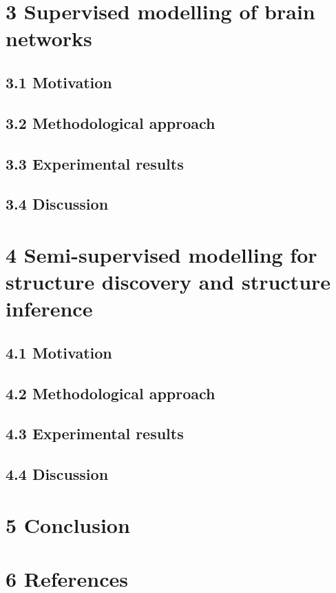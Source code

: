 \documentclass[authoryear,review,3p]{elsarticle}
\begin{document}
\section*{3 Supervised modelling of brain networks}

\subsection*{3.1 Motivation}
\subsection*{3.2 Methodological approach}
\subsection*{3.3 Experimental results}
\subsection*{3.4 Discussion}


\section*{4 Semi-supervised modelling for structure discovery
and structure inference}

\subsection*{4.1 Motivation}
\subsection*{4.2 Methodological approach}
\subsection*{4.3 Experimental results}
\subsection*{4.4 Discussion}




\section*{5 Conclusion}






\bigskip
\section*{6 References}



\end{document}
